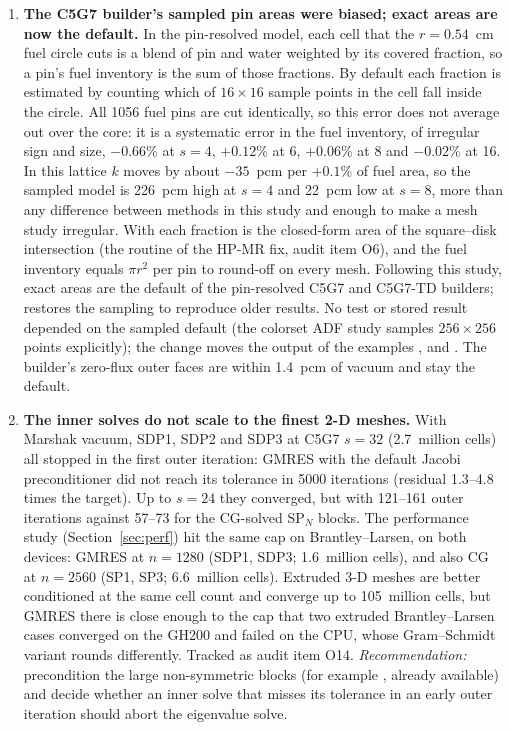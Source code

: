 \begin{enumerate}
\item \textbf{The C5G7 builder's sampled pin areas were biased; exact
  areas are now the default.} In the
  pin-resolved model, each cell that the $r = 0.54$~cm fuel circle cuts is a
  blend of pin and water weighted by its covered fraction, so a pin's fuel
  inventory is the sum of those fractions. By default each fraction is
  estimated by counting which of $16 \times 16$ sample points in the cell fall
  inside the circle. All 1056 fuel pins are cut identically, so this error
  does not average out over the core: it is a systematic error in the fuel
  inventory, of irregular sign and size, $-0.66$\% at $s = 4$, $+0.12$\% at 6,
  $+0.06$\% at 8 and $-0.02$\% at 16. In this lattice $k$ moves by about
  $-35$~pcm per $+0.1$\% of fuel area, so the sampled model is 226~pcm high at
  $s = 4$ and 22~pcm low at $s = 8$, more than any difference between methods
  in this study and enough to make a mesh study irregular. With
   each fraction is the closed-form area of the
  square--disk intersection (the routine of the HP-MR fix, audit item O6), and
  the fuel inventory equals $\pi r^2$ per pin to round-off on every mesh.
  Following this study, exact areas are the default of the pin-resolved
  C5G7 and C5G7-TD builders;  restores the sampling
  to reproduce older results. No test or stored result depended on the
  sampled default (the colorset ADF study samples $256 \times 256$ points
  explicitly); the change moves the output of the examples
  ,  and
  . The builder's zero-flux outer faces are
  within 1.4~pcm of vacuum and stay the default.

\item \textbf{The inner solves do not scale to the finest 2-D meshes.}
  With Marshak vacuum, SDP1, SDP2 and SDP3 at C5G7 $s = 32$
  (2.7~million cells) all stopped in the first outer iteration: GMRES with
  the default Jacobi preconditioner did not reach its tolerance in 5000
  iterations (residual 1.3--4.8 times the target). Up to $s = 24$ they
  converged, but with 121--161 outer iterations against 57--73 for the
  CG-solved SP$_N$ blocks. The performance study
  (Section~\ref{sec:perf}) hit the same cap on Brantley--Larsen, on both
  devices: GMRES at $n = 1280$ (SDP1, SDP3; 1.6~million cells), and also CG
  at $n = 2560$ (SP1, SP3; 6.6~million cells). Extruded 3-D meshes are better
  conditioned at the same cell count and converge up to 105~million cells,
  but GMRES there is close enough to the cap that two extruded
  Brantley--Larsen cases converged on the GH200 and failed on the CPU, whose
  Gram--Schmidt variant rounds differently.
  Tracked as audit item O14. \emph{Recommendation:} precondition the large
  non-symmetric blocks (for example , already
  available) and decide whether an inner solve that misses its tolerance in
  an early outer iteration should abort the eigenvalue solve.


\end{enumerate}
